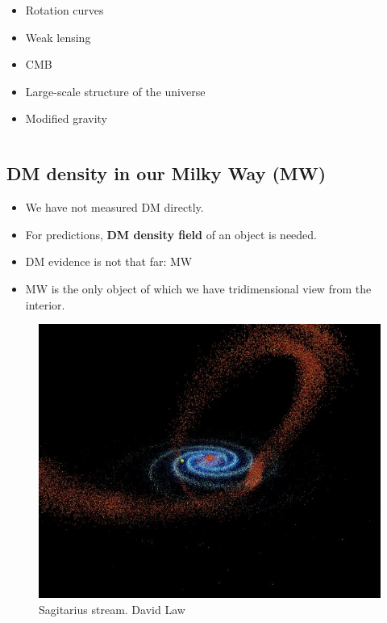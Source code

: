 \documentclass[xcolor=dvipsnames]{beamer}
\begin{document}
\begin{frame}
\begin{columns}[c]
\begin{column}{.5\textwidth}
\centering
\begin{itemize}
\small
\item Rotation curves
\item Weak lensing
\item CMB
\item Large-scale structure of the universe
\item Modified gravity
\end{itemize}
\end{column}

\end{columns}

\end{frame}
\subsection{DM density in our Milky Way (MW)}
\begin{frame}
\begin{itemize}
\small
\item We have not measured DM directly.
\item For predictions, \textbf{DM density field} of an object is needed.
\item DM evidence is not that far: MW
\item MW is the only object of which we have tridimensional view from the interior.
\end{itemize}

\begin{figure}[c]
\includegraphics[width=0.5\linewidth]{./pics/Sagitarius.jpg}
\caption{\tiny Sagitarius stream. David Law}
\end{figure}

\end{frame}
\end{document}
